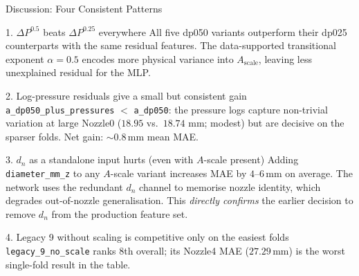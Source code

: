\documentclass[UTF8,aspectratio=169]{ctexbeamer}
\newcommand{\good}[1]{\textcolor{green!45!black}{#1}}
\newcommand{\warn}[1]{\textcolor{red!65!black}{#1}}
\begin{document}
\begin{frame}{Discussion: Four Consistent Patterns}
\small
\begin{block}{1. \good{$\Delta P^{0.5}$ beats $\Delta P^{0.25}$ everywhere}}
All five dp050 variants outperform their dp025 counterparts with the same residual features.
The data-supported transitional exponent $\alpha=0.5$ encodes more physical variance into $A_{\mathrm{scale}}$,
leaving less unexplained residual for the MLP.
\end{block}

\begin{block}{2. \good{Log-pressure residuals give a small but consistent gain}}
\texttt{a\_dp050\_plus\_pressures} $<$ \texttt{a\_dp050}: the pressure logs capture
non-trivial variation at large Nozzle0 ($18.95$ vs.\ $18.74$ mm; modest) but are decisive
on the sparser folds. Net gain: $\sim$0.8\,mm mean MAE.
\end{block}

\begin{block}{3. \warn{$d_n$ as a standalone input hurts (even with $A$-scale present)}}
Adding \texttt{diameter\_mm\_z} to any $A$-scale variant increases MAE by $4$--$6$\,mm on
average. The network uses the redundant $d_n$ channel to memorise nozzle identity, which
degrades out-of-nozzle generalisation. This \emph{directly confirms} the earlier decision
to remove $d_n$ from the production feature set.
\end{block}

\begin{block}{4. \warn{Legacy 9 without scaling is competitive only on the easiest folds}}
\texttt{legacy\_9\_no\_scale} ranks 8th overall; its Nozzle4 MAE ($27.29$\,mm) is the worst
single-fold result in the table.
\end{block}
\end{frame}
\end{document}
